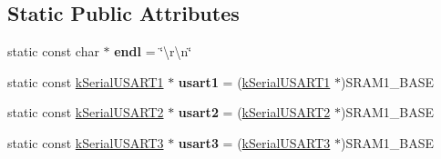 \subsection*{Static Public Attributes}
\begin{DoxyCompactItemize}
\item 
static const char $\ast$ {\bfseries endl} = \char`\"{}\textbackslash{}r\textbackslash{}n\char`\"{}\hypertarget{classkSerial_a1d11337d6e03ae21c20c8a5e9bde6892}{}\label{classkSerial_a1d11337d6e03ae21c20c8a5e9bde6892}

\item 
static const \hyperlink{structkSerialUSART1}{k\+Serial\+U\+S\+A\+R\+T1} $\ast$ {\bfseries usart1} = (\hyperlink{structkSerialUSART1}{k\+Serial\+U\+S\+A\+R\+T1} $\ast$)S\+R\+A\+M1\+\_\+\+B\+A\+SE\hypertarget{classkSerial_a497486a5bee4a4002166c3d97c89c9e9}{}\label{classkSerial_a497486a5bee4a4002166c3d97c89c9e9}

\item 
static const \hyperlink{structkSerialUSART2}{k\+Serial\+U\+S\+A\+R\+T2} $\ast$ {\bfseries usart2} = (\hyperlink{structkSerialUSART2}{k\+Serial\+U\+S\+A\+R\+T2} $\ast$)S\+R\+A\+M1\+\_\+\+B\+A\+SE\hypertarget{classkSerial_ab11f689af2a201037ac41ecfd910bedc}{}\label{classkSerial_ab11f689af2a201037ac41ecfd910bedc}

\item 
static const \hyperlink{structkSerialUSART3}{k\+Serial\+U\+S\+A\+R\+T3} $\ast$ {\bfseries usart3} = (\hyperlink{structkSerialUSART3}{k\+Serial\+U\+S\+A\+R\+T3} $\ast$)S\+R\+A\+M1\+\_\+\+B\+A\+SE\hypertarget{classkSerial_aa1ae9767d0d6a732af61bed9fa5e5a3d}{}\label{classkSerial_aa1ae9767d0d6a732af61bed9fa5e5a3d}

\end{DoxyCompactItemize}
